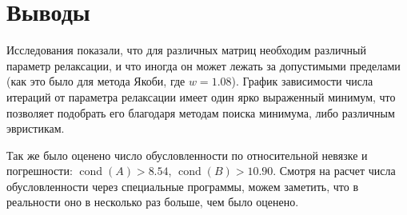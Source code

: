 \section{Выводы}

Исследования показали, что для различных матриц необходим различный параметр релаксации, и что иногда он может лежать за допустимыми пределами (как это было для метода Якоби, где $w = 1.08$). График зависимости числа итераций от параметра релаксации имеет один ярко выраженный минимум, что позволяет подобрать его благодаря методам поиска минимума, либо различным эвристикам.

Так же было оценено число обусловленности по относительной невязке и погрешности: $ \mathop{cond}(A) > 8.54 $, $ \mathop{cond}(B) > 10.90 $. Смотря на расчет числа обусловленности через специальные программы, можем заметить, что в реальности оно в несколько раз больше, чем было оценено.